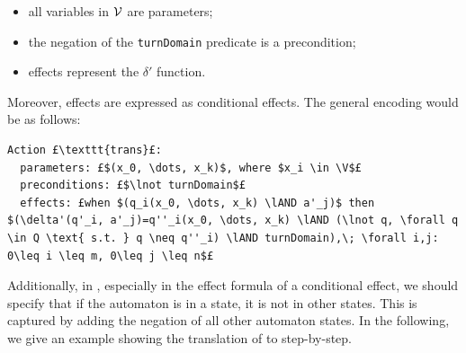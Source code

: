 \begin{itemize}
\item all variables in $\mathcal{V}$ are parameters;
\item the negation of the \texttt{turnDomain} predicate is a precondition;
\item effects represent the $\delta'$ function.
\end{itemize}
Moreover, effects are expressed as conditional effects. The general encoding would be as follows:
\begin{lstlisting}[escapechar=£]
Action £\texttt{trans}£:
  parameters: £$(x_0, \dots, x_k)$, where $x_i \in \V$£
  preconditions: £$\lnot turnDomain$£
  effects: £when $(q_i(x_0, \dots, x_k) \lAND a'_j)$ then $(\delta'(q'_i, a'_j)=q''_i(x_0, \dots, x_k) \lAND (\lnot q, \forall q \in Q \text{ s.t. } q \neq q''_i) \lAND turnDomain),\; \forall i,j: 0\leq i \leq m, 0\leq j \leq n$£
\end{lstlisting}

Additionally, in \PDDL, especially in the effect formula of a conditional effect, we should specify that if the automaton is in a state, it is not in other states. This is captured by adding the negation of all other automaton states. In the following, we give an example showing the translation of \DFAs to \PDDL step-by-step.

